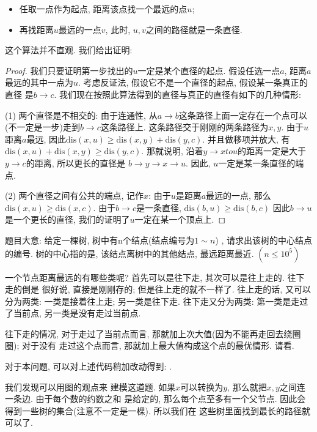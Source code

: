 \begin{itemize}
    \item 任取一点作为起点, 距离该点找一个最远的点$u$;
    \item 再找距离$u$最远的一点$v$, 此时, $u,v$之间的路径就是一条直径.
\end{itemize}

这个算法并不直观. 我们给出证明: 

\begin{proof}
    我们只要证明第一步找出的$u$一定是某个直径的起点. 假设任选一点$a$, 距离$a$
    最远的其中一点为$u$. 考虑反证法, 假设它不是一个直径的起点, 假设某一条真正的直径
    是$b\to c$. 我们现在按照此算法得到的直径与真正的直径有如下的几种情形: 

    (1) 两个直径是不相交的: 由于连通性, 从$a\to b$这条路径上面一定存在一个点可以
    (不一定是一步)走到$b\to c$这条路径上. 这条路径交于刚刚的两条路径为$x, y$. 
    由于$u$距离$a$最远, 因此$\text{dis}(x, u)\geq \text{dis}(x,y)+\text{dis}(y,c)$. 
    并且做移项并放大, 有$\text{dis}(x, u)+\text{dis}(x,y) \geq \text{dis}(y,c)$.
    那就说明, 沿着$y\to xto u$的距离一定是大于$y\to c$的距离, 所以更长的直径是
    $b\to y\to x\to u$. 因此, $u$一定是某一条直径的端点. 
    
    (2) 两个直径之间有公共的端点, 记作$x$: 由于$u$是距离$a$最远的一点, 那么
    $\text{dis}{(x,u)}\geq \text{dis}{(x, c)}$. 由于$b\to c$是一条直径, $\text{dis}(b,u)\geq \text{dis}(b,c)$
    因此$b\to u$是一个更长的直径, 我们的证明了$u$一定在某一个顶点上. 
    
\end{proof}

题目大意: 给定一棵树, 树中有n个结点(结点编号为$1\sim n$)
, 请求出该树的中心结点的编号. 树的中心指的是, 该结点离树中的其他结点, 最远距离最近. $(n\leq 10^5)$

一个节点距离最远的有哪些类呢? 首先可以是往下走, 其次可以是往上走的. 往下走的倒是
很好说, 直接是刚刚存的; 但是往上走的就不一样了. 往上走的话, 又可以分为两类: 一类是接着往上走; 
另一类是往下走. 往下走又分为两类: 第一类是走过了当前点, 另一类是没有走过当前点. 

往下走的情况, 对于走过了当前点而言, 那就加上次大值(因为不能再走回去绕圈圈); 对于没有
走过这个点而言, 那就加上最大值构成这个点的最优情形. 请看.

对于本问题, 可以对上述代码稍加改动得到: .

 我们发现可以用图的观点来
建模这道题. 如果$x$可以转换为$y$, 那么就把$x, y$之间连一条边. 由于每个数的约数之和
是给定的, 那么每个点至多有一个父节点. 因此会得到一些树的集合(注意不一定是一棵). 所以我们在
这些树里面找到最长的路径就可以了. 

